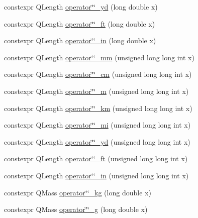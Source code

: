 \begin{DoxyCompactItemize}
\item 
constexpr Q\+Length \mbox{\hyperlink{namespaceokapi_1_1literals_abd0e2b409e8196d383eef69044bb9d67}{operator\char`\"{}\char`\"{}\+\_\+yd}} (long double x)
\item 
constexpr Q\+Length \mbox{\hyperlink{namespaceokapi_1_1literals_ae92924d9cc4e948130b70ccba8687a3a}{operator\char`\"{}\char`\"{}\+\_\+ft}} (long double x)
\item 
constexpr Q\+Length \mbox{\hyperlink{namespaceokapi_1_1literals_afad4d7e9c13571cf2ec0dde7e0008a72}{operator\char`\"{}\char`\"{}\+\_\+in}} (long double x)
\item 
constexpr Q\+Length \mbox{\hyperlink{namespaceokapi_1_1literals_a509f84df84a03f3a4fc1d5004d73ff05}{operator\char`\"{}\char`\"{}\+\_\+mm}} (unsigned long long int x)
\item 
constexpr Q\+Length \mbox{\hyperlink{namespaceokapi_1_1literals_aee248e89ed1fd0ae224a80eaac04be72}{operator\char`\"{}\char`\"{}\+\_\+cm}} (unsigned long long int x)
\item 
constexpr Q\+Length \mbox{\hyperlink{namespaceokapi_1_1literals_ad7a8fb6325c0bdf2fb444cb95bb8f0a7}{operator\char`\"{}\char`\"{}\+\_\+m}} (unsigned long long int x)
\item 
constexpr Q\+Length \mbox{\hyperlink{namespaceokapi_1_1literals_a820d5a94f0ca54b6f65ca1191801fae0}{operator\char`\"{}\char`\"{}\+\_\+km}} (unsigned long long int x)
\item 
constexpr Q\+Length \mbox{\hyperlink{namespaceokapi_1_1literals_a31846758da45d0f07eaf9110e4f1a4d8}{operator\char`\"{}\char`\"{}\+\_\+mi}} (unsigned long long int x)
\item 
constexpr Q\+Length \mbox{\hyperlink{namespaceokapi_1_1literals_a09b0c61689eb453818ff2126df2cde26}{operator\char`\"{}\char`\"{}\+\_\+yd}} (unsigned long long int x)
\item 
constexpr Q\+Length \mbox{\hyperlink{namespaceokapi_1_1literals_a8343123efcfb6bee7df737f7981f4589}{operator\char`\"{}\char`\"{}\+\_\+ft}} (unsigned long long int x)
\item 
constexpr Q\+Length \mbox{\hyperlink{namespaceokapi_1_1literals_a78c6b310757ea9a0e0c48315c194c366}{operator\char`\"{}\char`\"{}\+\_\+in}} (unsigned long long int x)
\item 
constexpr Q\+Mass \mbox{\hyperlink{namespaceokapi_1_1literals_a64be793bec350dc02ca149670dfa3942}{operator\char`\"{}\char`\"{}\+\_\+kg}} (long double x)
\item 
constexpr Q\+Mass \mbox{\hyperlink{namespaceokapi_1_1literals_a804d615fdde9f059303992644b09e6f1}{operator\char`\"{}\char`\"{}\+\_\+g}} (long double x)

\end{DoxyCompactItemize}
